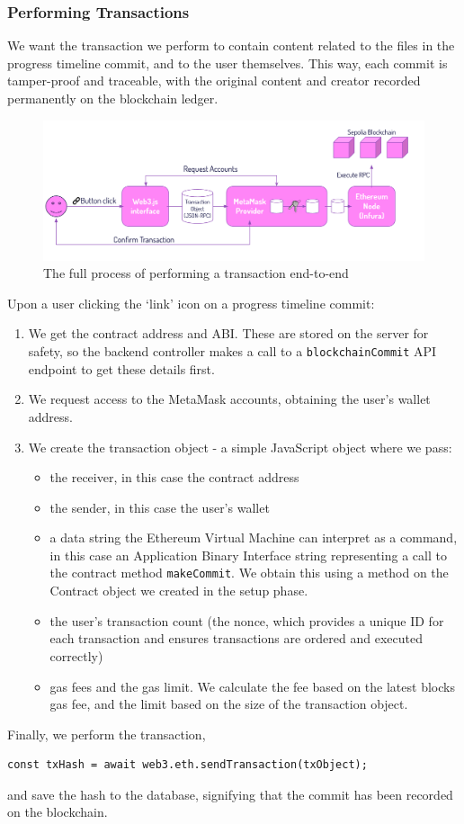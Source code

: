 \documentclass[12pt,a4paper]{article}
\begin{document}
\subsubsection{Performing Transactions}
We want the transaction we perform to contain content related to the files in the progress timeline commit, and to the user themselves. This way, each commit is tamper-proof and traceable, with the original content and creator recorded permanently on the blockchain ledger.
\begin{figure}[H]
    \centering
    \includegraphics[scale=0.55]{bchain.png}
    \caption{The full process of performing a transaction end-to-end}
\end{figure}
Upon a user clicking the `link' icon on a progress timeline commit:
\begin{enumerate}
    \item We get the contract address and ABI. These are stored on the server for safety, so the backend controller makes a call to a \verb|blockchainCommit| API endpoint to get these details first. 
    \item We request access to the MetaMask accounts, obtaining the user's wallet address.
    \item We create the transaction object - a simple JavaScript object where we pass:
    \begin{itemize}
        \item the receiver, in this case the contract address
        \item the sender, in this case the user's wallet
        \item a data string the Ethereum Virtual Machine can interpret as a command, in this case an Application Binary Interface string representing a call to the contract method \verb|makeCommit|. We obtain this using a method on the Contract object we created in the setup phase.
        \item the user's transaction count (the nonce, which provides a unique ID for each transaction and ensures transactions are ordered and executed correctly)
        \item gas fees and the gas limit. We calculate the fee based on the latest blocks gas fee, and the limit based on the size of the transaction object.
    \end{itemize}
\end{enumerate}
Finally, we perform the transaction, 
\begin{lstlisting}
const txHash = await web3.eth.sendTransaction(txObject);
\end{lstlisting}
and save the hash to the database, signifying that the commit has been recorded on the blockchain.
\end{document}
